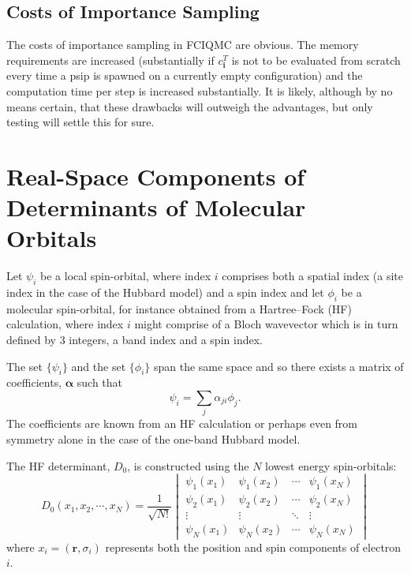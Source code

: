 \documentclass{article}
\newcommand{\bi}{\boldsymbol{i}}
\newcommand{\br}{\boldsymbol{r}}
\begin{document}
\subsection{Costs of Importance Sampling}

The costs of importance sampling in FCIQMC are obvious. The memory
requirements are increased (substantially if $c_{\bi}^T$ is not to be
evaluated from scratch every time a psip is spawned on a currently
empty configuration) and the computation time per step is increased
substantially. It is likely, although by no means certain, that these
drawbacks will outweigh the advantages, but only testing will settle
this for sure.


\appendix


\section{Real-Space Components of Determinants of Molecular Orbitals}
\label{sec:AppA}


Let $\psi_i$ be a local spin-orbital, where index $i$ comprises both a spatial index (a site index in the case of the Hubbard model) and a spin index and let $\phi_i$ be a molecular spin-orbital, for instance obtained from a Hartree--Fock (HF) calculation, where index $i$ might comprise of a Bloch wavevector which is in turn defined by 3 integers, a band index and a spin index.

The set $\{\psi_i\}$ and the set $\{\phi_i\}$ span the same space and so there exists a matrix of coefficients, $\mathbf{\alpha}$ such that
\begin{displaymath}
\psi_i = \sum_j \alpha_{ji} \phi_j.
\end{displaymath}
The coefficients are known from an HF calculation or perhaps even from symmetry alone in the case of the one-band Hubbard model.

The HF determinant, $D_0$, is constructed using the $N$ lowest energy spin-orbitals:
\begin{displaymath}
D_0(x_1, x_2, \cdots, x_N) = \frac{1}{\sqrt{N!}}
\begin{vmatrix}
\psi_1(x_1) & \psi_1(x_2) & \cdots & \psi_1(x_N) \\
\psi_2(x_1) & \psi_2(x_2) & \cdots & \psi_2(x_N) \\
\vdots      & \vdots      & \ddots & \vdots      \\
\psi_N(x_1) & \psi_N(x_2) & \cdots & \psi_N(x_N)
\end{vmatrix}
\end{displaymath}
where $x_i=(\br,\sigma_i)$ represents both the position and spin components of electron $i$.
\end{document}

